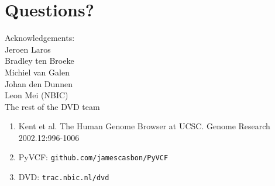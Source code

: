 \documentclass[slidestop]{beamer}
\begin{document}
\section{Questions?}
\lastpagetemplate
\begin{frame}
  \begin{center}
    Acknowledgements:\\
    \vspace{0.8cm}
    Jeroen Laros\\
    Bradley ten Broeke\\
    Michiel van Galen\\
    Johan den Dunnen\\
    \vspace{0.8cm}
    Leon Mei (NBIC)\\
    The rest of the DVD team
  \end{center}
  \vspace{1cm}
  {\tiny
    \begin{enumerate}
      \item Kent et al. The Human Genome Browser at UCSC. Genome Research 2002.12:996-1006
      \item PyVCF: \texttt{github.com/jamescasbon/PyVCF}
      \item DVD: \texttt{trac.nbic.nl/dvd}
    \end{enumerate}
  }
\end{frame}
\end{document}
